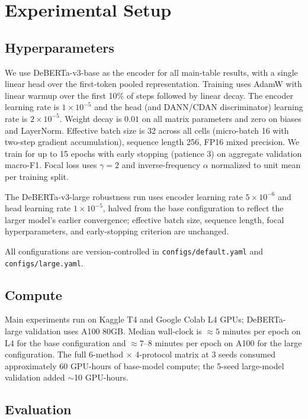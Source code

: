 \section{Experimental Setup}
\label{sec:setup}

\subsection{Hyperparameters}

We use DeBERTa-v3-base \citep{he2023deberta} as the encoder for all
main-table results, with a single linear head over the first-token
pooled representation. Training uses AdamW with linear warmup over the
first 10\% of steps followed by linear decay. The encoder learning
rate is $1{\times}10^{-5}$ and the head (and DANN/CDAN discriminator)
learning rate is $2{\times}10^{-5}$. Weight decay is $0.01$ on all
matrix parameters and zero on biases and LayerNorm. Effective batch
size is 32 across all cells (micro-batch 16 with two-step gradient
accumulation), sequence length 256, FP16 mixed precision. We train for
up to 15 epochs with early stopping (patience 3) on aggregate
validation macro-F1. Focal loss uses $\gamma=2$ and inverse-frequency
$\alpha$ normalized to unit mean per training split.

The DeBERTa-v3-large robustness run uses encoder learning rate
$5{\times}10^{-6}$ and head learning rate $1{\times}10^{-5}$, halved
from the base configuration to reflect the larger model's earlier
convergence; effective batch size, sequence length, focal
hyperparameters, and early-stopping criterion are unchanged.

All configurations are version-controlled in
\texttt{configs/default.yaml} and \texttt{configs/large.yaml}.

\subsection{Compute}

Main experiments run on Kaggle T4 and Google Colab L4 GPUs;
DeBERTa-large validation uses A100 80GB. Median wall-clock is
$\approx 5$ minutes per epoch on L4 for the base configuration and
$\approx 7$--$8$ minutes per epoch on A100 for the large
configuration. The full 6-method $\times$ 4-protocol matrix at 3
seeds consumed approximately 60 GPU-hours of base-model compute; the
5-seed large-model validation added $\sim$10 GPU-hours.

\subsection{Evaluation}

